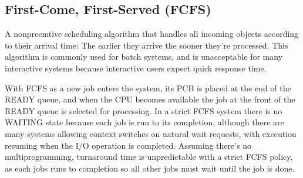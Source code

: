 \documentclass[12pt letter]{report}
\begin{document}

\subsection{First-Come, First-Served (FCFS)}

A nonpreemtive scheduling algorithm that handles all incoming objects
according to their arrival time: The earlier they arrive the sooner
they're processed. This algorithm is commonly used for batch systems,
and is unacceptable for many interactive systems because interactive
users expect quick response time.

With FCFS as a new job enters the system, its PCB is placed at the
end of the READY queue, and when the CPU becomes available the job at
the front of the READY queue is selected for processing. In a strict
FCFS system there is no WAITING state because each job is run to its
completion, although there are many systems allowing context switches
on natural wait requests, with execution resuming when the I/O
operation is completed. Assuming there's no multiprogramming,
turnaround time is unpredictable with a strict FCFS policy, as each
jobs runs to completion so all other jobs must wait until the job is done.

\end{document}
